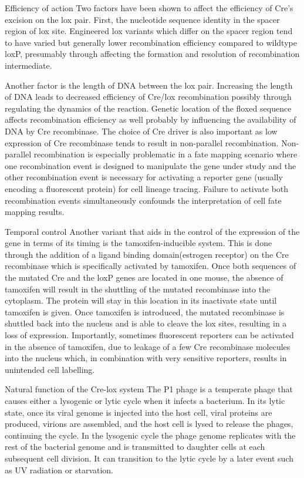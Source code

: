 Efficiency of action
Two factors have been shown to affect the efficiency of Cre's excision on the lox pair. First, the nucleotide sequence identity in the spacer region of lox site. Engineered lox variants which differ on the spacer region tend to have varied but generally lower recombination efficiency compared to wildtype loxP, presumably through affecting the formation and resolution of recombination intermediate.

Another factor is the length of DNA between the lox pair. Increasing the length of DNA leads to decreased efficiency of Cre/lox recombination possibly through regulating the dynamics of the reaction. Genetic location of the floxed sequence affects recombination efficiency as well probably by influencing the availability of DNA by Cre recombinase. The choice of Cre driver is also important as low expression of Cre recombinase tends to result in non-parallel recombination. Non-parallel recombination is especially problematic in a fate mapping scenario where one recombination event is designed to manipulate the gene under study and the other recombination event is necessary for activating a reporter gene (usually encoding a fluorescent protein) for cell lineage tracing. Failure to activate both recombination events simultaneously confounds the interpretation of cell fate mapping results.

Temporal control
Another variant that aids in the control of the expression of the gene in terms of its timing is the tamoxifen-inducible system. This is done through the addition of a ligand binding domain(estrogen receptor) on the Cre recombinase which is specifically activated by tamoxifen. Once both sequences of the mutated Cre and the loxP genes are located in one mouse, the absence of tamoxifen will result in the shuttling of the mutated recombinase into the cytoplasm. The protein will stay in this location in its inactivate state until tamoxifen is given. Once tamoxifen is introduced, the mutated recombinase is shuttled back into the nucleus and is able to cleave the lox sites, resulting in a loss of expression. Importantly, sometimes fluorescent reporters can be activated in the absence of tamoxifen, due to leakage of a few Cre recombinase molecules into the nucleus which, in combination with very sensitive reporters, results in unintended cell labelling.

Natural function of the Cre-lox system
The P1 phage is a temperate phage that causes either a lysogenic or lytic cycle when it infects a bacterium. In its lytic state, once its viral genome is injected into the host cell, viral proteins are produced, virions are assembled, and the host cell is lysed to release the phages, continuing the cycle. In the lysogenic cycle the phage genome replicates with the rest of the bacterial genome and is transmitted to daughter cells at each subsequent cell division. It can transition to the lytic cycle by a later event such as UV radiation or starvation.

